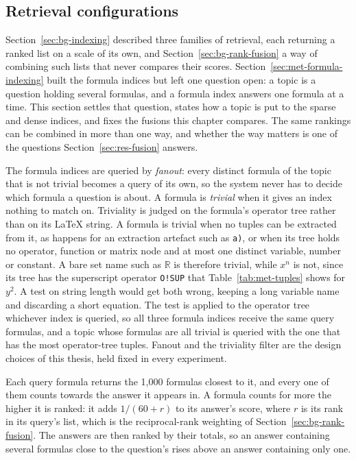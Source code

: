 \subsection{Retrieval configurations}\label{sec:met-retrieval-configs}

Section~\ref{sec:bg-indexing} described three families of retrieval, each returning a ranked
list on a scale of its own, and Section~\ref{sec:bg-rank-fusion} a way of combining such lists
that never compares their scores. Section~\ref{sec:met-formula-indexing} built the formula
indices but left one question open: a topic is a question holding several formulas, and a
formula index answers one formula at a time. This section settles that question, states how a
topic is put to the sparse and dense indices, and fixes the fusions this chapter compares. The
same rankings can be combined in more than one way, and whether the way matters is one of the
questions Section~\ref{sec:res-fusion} answers.

The formula indices are queried by \emph{fanout}: every distinct formula of the topic that is
not trivial becomes a query of its own, so the system never has to decide which formula a
question is about. A formula is \emph{trivial} when it gives an index nothing to match on.
Triviality is judged on the formula's operator tree rather than on its \LaTeX{} string. A
formula is trivial when no tuples can be extracted from it, as happens for an extraction
artefact such as \texttt{a)}, or when its tree holds no operator, function or matrix node and
at most one distinct variable, number or constant. A bare set name such as $\mathbb{R}$ is
therefore trivial, while $x^n$ is not, since its tree has the superscript operator
\texttt{O!SUP} that Table~\ref{tab:met-tuples} shows for $y^2$. A test on string length would
get both wrong, keeping a long variable name and discarding a short equation. The test is
applied to the operator tree whichever index is queried, so all three formula indices receive
the same query formulas, and a topic whose formulas are all trivial is queried with the one
that has the most operator-tree tuples. Fanout and the triviality filter are the design choices
of this thesis, held fixed in every experiment.

Each query formula returns the 1{,}000 formulas closest to it, and every one of them counts
towards the answer it appears in. A formula counts for more the higher it is ranked: it adds
$1/(60 + r)$ to its answer's score, where $r$ is its rank in its query's list, which is the
reciprocal-rank weighting of Section~\ref{sec:bg-rank-fusion}. The answers are then ranked by
their totals, so an answer containing several formulas close to the question's rises above an
answer containing only one.

